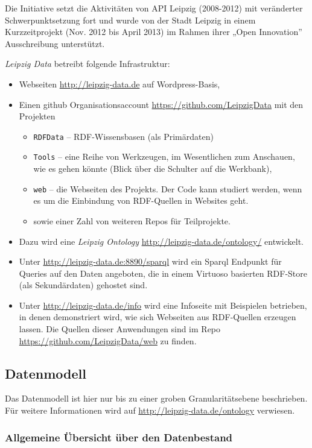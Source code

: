 \documentclass[a4paper,11pt]{article}
\begin{document}
Die Initiative setzt die Aktivitäten von API Leipzig (2008-2012) mit
veränderter Schwerpunktsetzung fort und wurde von der Stadt Leipzig in einem
Kurzzeitprojekt (Nov. 2012 bis April 2013) im Rahmen ihrer „Open Innovation”
Ausschreibung unterstützt.
 
\emph{Leipzig Data} betreibt folgende Infrastruktur:
\begin{itemize}\itemsep0pt
\item Webseiten \url{http://leipzig-data.de} auf Wordpress-Basis,
\item Einen github Organisationsaccount \url{https://github.com/LeipzigData}
  mit den Projekten
  \begin{itemize}\itemsep0pt
  \item \texttt{RDFData} – RDF-Wissensbasen (als Primärdaten)
  \item \texttt{Tools} – eine Reihe von Werkzeugen, im Wesentlichen zum
    Anschauen, wie es gehen könnte (Blick über die Schulter auf die Werkbank), 
  \item \texttt{web} – die Webseiten des Projekts. Der Code kann studiert
    werden, wenn es um die Einbindung von RDF-Quellen in Websites geht.
  \item sowie einer Zahl von weiteren Repos für Teilprojekte.
  \end{itemize}
\item Dazu wird eine \emph{Leipzig Ontology}
  \url{http://leipzig-data.de/ontology/} entwickelt.
\item Unter \url{http://leipzig-data.de:8890/sparql} wird ein Sparql Endpunkt
  für Queries auf den Daten angeboten, die in einem Virtuoso basierten
  RDF-Store (als Sekundärdaten) gehostet sind.
\item Unter \url{http://leipzig-data.de/info} wird eine Infoseite mit
  Beispielen betrieben, in denen demonstriert wird, wie sich Webseiten aus
  RDF-Quellen erzeugen lassen.  Die Quellen dieser Anwendungen sind im Repo
  \url{https://github.com/LeipzigData/web} zu finden. 
\end{itemize}

\subsection{Datenmodell}

Das Datenmodell ist hier nur bis zu einer groben Granularitätsebene
beschrieben.  Für weitere Informationen wird auf
\url{http://leipzig-data.de/ontology} verwiesen.

\subsubsection*{Allgemeine Übersicht über den Datenbestand}
\end{document}
